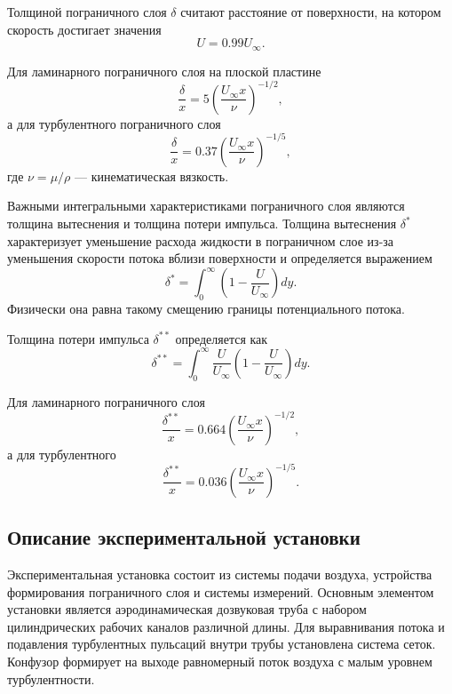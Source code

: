 \documentclass[12pt,a4paper]{article}
\begin{document}
Толщиной пограничного слоя $\delta$ считают расстояние от поверхности, на котором скорость достигает значения
\begin{equation}
U = 0.99 U_\infty. \tag{3}
\end{equation}

Для ламинарного пограничного слоя на плоской пластине
\begin{equation}
\frac{\delta}{x} = 5 \left( \frac{U_\infty x}{\nu} \right)^{-1/2}, \tag{4}
\end{equation}
а для турбулентного пограничного слоя
\begin{equation}
\frac{\delta}{x} = 0.37 \left( \frac{U_\infty x}{\nu} \right)^{-1/5}, \tag{5}
\end{equation}
где $\nu = \mu / \rho$ — кинематическая вязкость.

Важными интегральными характеристиками пограничного слоя являются толщина вытеснения и толщина потери импульса. Толщина вытеснения $\delta^*$ характеризует уменьшение расхода жидкости в пограничном слое из-за уменьшения скорости потока вблизи поверхности и определяется выражением
\begin{equation}
\delta^* = \int_0^\infty \left( 1 - \frac{U}{U_\infty} \right) dy. \tag{6}
\end{equation}
Физически она равна такому смещению границы потенциального потока.

Толщина потери импульса $\delta^{**}$ определяется как
\begin{equation}
\delta^{**} = \int_0^\infty \frac{U}{U_\infty} \left( 1 - \frac{U}{U_\infty} \right) dy. \tag{7}
\end{equation}

Для ламинарного пограничного слоя
\begin{equation}
\frac{\delta^{**}}{x} = 0.664 \left( \frac{U_\infty x}{\nu} \right)^{-1/2}, \tag{8}
\end{equation}
а для турбулентного
\begin{equation}
\frac{\delta^{**}}{x} = 0.036 \left( \frac{U_\infty x}{\nu} \right)^{-1/5}. \tag{9}
\end{equation}


\subsection{Описание экспериментальной установки}

Экспериментальная установка состоит из системы подачи воздуха, устройства формирования пограничного слоя и системы измерений. Основным элементом установки является аэродинамическая дозвуковая труба с набором цилиндрических рабочих каналов различной длины. Для выравнивания потока и подавления турбулентных пульсаций внутри трубы установлена система сеток. Конфузор формирует на выходе равномерный поток воздуха с малым уровнем турбулентности.
\end{document}
